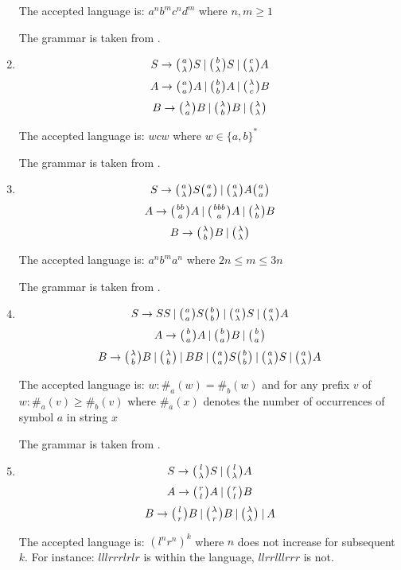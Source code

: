 \begin{enumerate}
{    The accepted language is: $a^nb^mc^nd^m$ where $n, m \geq 1$

    The grammar is taken from \cite{WK_GRAMMARS_1}.
  }

  \item{
    $$S \rightarrow \wkpair{a}{\lambda} S \:|\: \wkpair{b}{\lambda} S \:|\: \wkpair{c}{\lambda} A$$
    $$A \rightarrow \wkpair{a}{a} A \:|\: \wkpair{b}{b} A \:|\: \wkpair{\lambda}{c} B$$
    $$B \rightarrow \wkpair{\lambda}{a} B \:|\: \wkpair{\lambda}{b} B \:|\: \wkpair{\lambda}{\lambda}$$

    The accepted language is: $wcw$ where $w \in \{a, b\}^*$

    The grammar is taken from \cite{WK_GRAMMARS_1}.
  }

  \item{
    $$S \rightarrow \wkpair{a}{\lambda} S \wkpair{a}{a} \:|\: \wkpair{a}{\lambda} A \wkpair{a}{a} $$
    $$A \rightarrow \wkpair{bb}{a} A \:|\: \wkpair{bbb}{a} A \:|\: \wkpair{\lambda}{b} B$$
    $$B \rightarrow \wkpair{\lambda}{b} B \:|\: \wkpair{\lambda}{\lambda}$$

    The accepted language is: $a^nb^ma^n$ where $2n \leq m \leq 3n$

    The grammar is taken from \cite{WK_GRAMMARS_1}.
  }

  \item{
    $$S \rightarrow S S \:|\: \wkpair{a}{a} S \wkpair{b}{b} \:|\: \wkpair{a}{\lambda} S \:|\: \wkpair{a}{\lambda} A$$
    $$A \rightarrow \wkpair{b}{a} A \:|\: \wkpair{b}{a} B \:|\: \wkpair{b}{a}$$
    $$B \rightarrow \wkpair{\lambda}{b} B \:|\: \wkpair{\lambda}{b} \:|\: B B \:|\: \wkpair{a}{a} S \wkpair{b}{b} \:|\: \wkpair{a}{\lambda} S \:|\: \wkpair{a}{\lambda} A$$

    The accepted language is: $w: \#_a(w) = \#_b(w)$ and for any prefix $v$ of $w: \#_a(v) \geq \#_b(v)$  where $\#_a(x)$ denotes the number of occurrences of symbol $a$ in string $x$

    The grammar is taken from \cite{WK_CYK}.
  }

  \item{
    $$S \rightarrow \wkpair{l}{\lambda} S \:|\: \wkpair{l}{\lambda} A$$
    $$A \rightarrow \wkpair{r}{l} A \:|\: \wkpair{r}{l} B$$
    $$B \rightarrow \wkpair{l}{r} B \:|\: \wkpair{\lambda}{r} B \:|\: \wkpair{\lambda}{\lambda} \:|\: A$$

    The accepted language is: $(l^n r^n)^k$ where $n$ does not increase for subsequent $k$. For instance: $lllrrrlrlr$ is within the language, $llrrlllrrr$ is not.

}
\end{enumerate}
